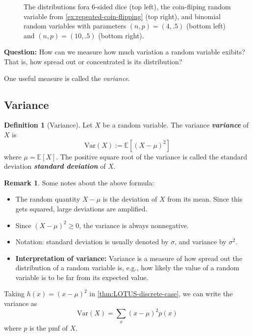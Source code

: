\documentclass[10pt]{article}
\theoremstyle{definition}
\newtheorem{definition}[theorem]{Definition}
\newtheorem{remark}[theorem]{Remark}
\newcommand{\vt}{\vskip 5mm} %
\newcommand{\Fl}{\vt\noindent\textbf} %
\newcommand{\1}[1]{\textbf{1}_{\left[#1\right]}} %
\def\E{\mathbb{E}} %
\def\Var{\mathrm{Var}} %
\DeclareRobustCommand{\demph}[1]{%
  \ifmmode
  {\color{Blue}#1}%
  \else
  {\color{Blue}\bfseries\slshape #1}%
  \fi
}
\begin{document}
\begin{figure}[ht]
\begin{tikzpicture}[x=1cm,y=5cm]
  \end{tikzpicture}
  \caption{The distributions fora 6-sided dice (top left),
    the coin-fliping random variable from \cref{ex:repeated-coin-flipping} (top right),
    and binomial random variables with parameters $(n,p)=(4,.5)$ (bottom left)
    and $(n,p)=(10,.5)$ (bottom right).}
\end{figure}

\Fl{Question:} How can we measure how much variation a random variable
exibits? That is, how spread out or concentrated is its distribution?

One useful measure is called the \textit{variance}.

\subsection{Variance}
\begin{definition}[Variance]
  \label{def:variance}
  Let $X$ be a random variable. The \demph{variance} of $X$ is
  \begin{equation*}
    \text{Var}(X) := \E\left[(X-\mu)^{2} \right]
  \end{equation*}
  where $\mu= \E\left[X \right]$. The positive square root of the variance is
  called the \demph{standard deviation} of $X$.
\end{definition}

\begin{remark}
  Some notes about the above formula:
  \begin{itemize}
    \item The random quantity $X-\mu$ is the deviation of $X$ from its mean.
    Since this gets squared, large deviations are amplified.
    \item Since $(X-\mu)^{2}\geq 0$, the variance is always nonnegative.
    \item Notation: standard deviation is usually denoted by $\sigma$, and
    variance by $\sigma^{2}$.
    \item \textbf{Interpretation of variance:} Variance is a measure of how spread
    out the distribution of a random variable is, e.g., how likely the value
    of a random variable is to be far from its expected value.
  \end{itemize}
\end{remark}


Taking $h(x)= (x-\mu)^{2}$ in \cref{thm:LOTUS-discrete-case}, we can write the
variance as
\begin{equation*}
  \Var(X) = \sum_{x}(x-\mu)^{2}p(x)
\end{equation*}
where $p$ is the pmf of $X$.
\end{document}
